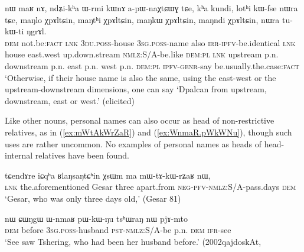 \begin{exe}
\ex \label{ex:maNlo.dpalcan}
\gll  nɯ maʁ nɤ, ndʑi-kʰa ɯ-rmi kɯnɤ a-pɯ-naχtɕɯɣ tɕe, kʰa kundi, lotʰi kɯ-fse nɯra tɕe,
maŋlo χpɤltɕin, maŋtʰi χpɤltɕin, maŋkɯ χpɤltɕin, maŋndi χpɤltɕin, nɯra tu-kɯ-ti ŋgrɤl. \\
\textsc{dem} not.be:\textsc{fact} \textsc{lnk} \textsc{3du}.\textsc{poss}-house \textsc{3sg}.\textsc{poss}-name also \textsc{irr}-\textsc{ipfv}-be.identical \textsc{lnk} house east.west up.down.stream \textsc{nmlz}:S/A-be.like \textsc{dem}:\textsc{pl} \textsc{lnk} upstream p.n. downstream p.n. east p.n. west p.n. \textsc{dem}:\textsc{pl} \textsc{ipfv}-\textsc{genr}-say be.usually.the.case:\textsc{fact} \\
\glt `Otherwise, if their house name is also the same, using the east-west or the upstream-downstream dimensions, one can say `Dpalcan from upstream, downstream, east or west.' (elicited)
\end{exe}

Like other nouns, personal names can also occur as head of non-restrictive relatives, as in  (\ref{ex:mWtAkWrZaR}) and (\ref{ex:WnmaR.pWkWNu}), though such uses are rather uncommon. No examples of personal names as heads of head-internal relatives have been found.

  \begin{exe}
\ex \label{ex:mWtAkWrZaR}
\gll  tɕendɤre 	iɕqʰa 	ʁlaŋsaŋtɕʰin 	χsɯm 	ma 	mɯ-tɤ-kɯ-rʑaʁ 	nɯ, \\
\textsc{lnk} the.aforementioned Gesar three apart.from \textsc{neg}-\textsc{pfv}-\textsc{nmlz}:S/A-pass.days \textsc{dem} \\
\glt `Gesar, who was only three days old,'  (Gesar 81)
\end{exe}

\begin{exe}
\ex \label{ex:WnmaR.pWkWNu}
\gll nɯ ɕɯŋgɯ ɯ-nmaʁ pɯ-kɯ-ŋu tsʰɯraŋ nɯ pjɤ-mto  \\
\textsc{dem} before \textsc{3sg}.\textsc{poss}-husband \textsc{pst}-\textsc{nmlz}:S/A-be p.n. \textsc{dem} \textsc{ifr}-see \\
\glt `See saw Tshering, who had been her husband before.' (2002qajdoskAt, 
\end{exe}


